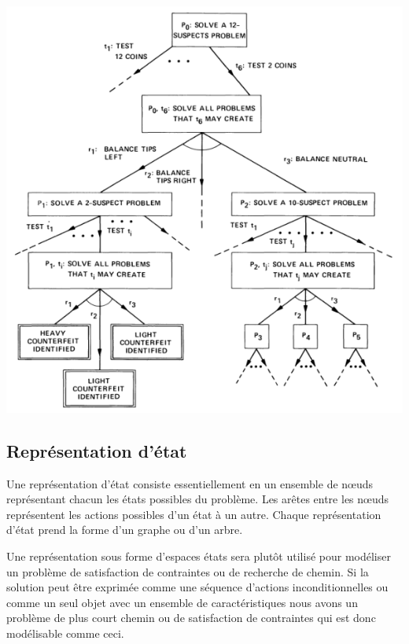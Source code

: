 \begin{center}
    \includegraphics[scale=0.8]{../ressources/images/counterfeit_problem_and_or_graph.png}
\end{center}


\subsection{Représentation d'état}
Une représentation d'état consiste essentiellement en un ensemble de nœuds représentant chacun les états possibles du problème. Les arêtes entre les nœuds représentent les actions possibles d'un état à un autre. 
Chaque représentation d'état prend la forme d'un graphe ou d'un arbre.

Une représentation sous forme d'espaces états sera plutôt utilisé pour modéliser un problème de satisfaction de contraintes ou de recherche de chemin.
Si la solution peut être exprimée comme une séquence d'actions inconditionnelles ou comme un seul objet avec un ensemble de caractéristiques nous avons un problème de plus court chemin ou de satisfaction de contraintes qui est donc modélisable comme ceci.

